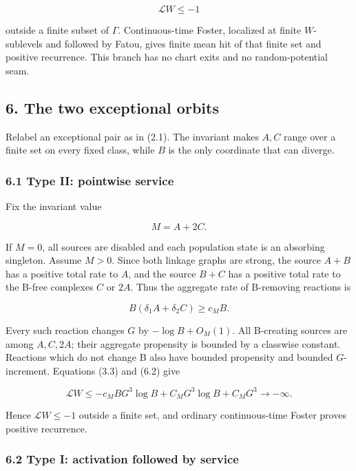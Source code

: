 \[
                         \mathcal LW\le-1            \tag{5.3}
\]

outside a finite subset of \(\Gamma\). Continuous-time Foster, localized
at finite \(W\)-sublevels and followed by Fatou, gives finite mean hit
of that finite set and positive recurrence. This branch has no chart
exits and no random-potential seam.

\subsection{6. The two exceptional
orbits}

Relabel an exceptional pair as in (2.1). The invariant makes \(A,C\)
range over a finite set on every fixed class, while \(B\) is the only
coordinate that can diverge.

\subsubsection{6.1 Type II: pointwise
service}

Fix the invariant value

\[
                         M=A+2C.                     \tag{6.1}
\]

If \(M=0\), all sources are disabled and each population state is an
absorbing singleton. Assume \(M>0\). Since both linkage graphs are
strong, the source \(A+B\) has a positive total rate to \(A\), and the
source \(B+C\) has a positive total rate to the B-free complexes \(C\)
or \(2A\). Thus the aggregate rate of B-removing reactions is

\[
       B(\delta_1A+\delta_2C)\ge c_M B.              \tag{6.2}
\]

Every such reaction changes \(G\) by \(-\log B+O_M(1)\). All B-creating
sources are among \(A,C,2A\); their aggregate propensity is bounded by a
classwise constant. Reactions which do not change B also have bounded
propensity and bounded \(G\)-increment. Equations (3.3) and (6.2) give

\[
 \mathcal LW
 \le-c_M B G^3\log B+C_MG^3\log B+C_MG^3
 \longrightarrow-\infty.                            \tag{6.3}
\]

Hence \(\mathcal LW\le-1\) outside a finite set, and ordinary
continuous-time Foster proves positive recurrence.

\subsubsection{6.2 Type I: activation followed by
service}

